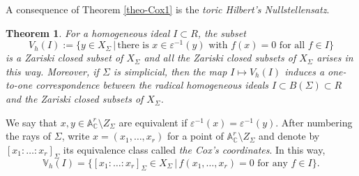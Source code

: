 \documentclass[11pt, reqno]{amsart}
\theoremstyle{plain}
\newtheorem{theorem}{Theorem}[section]
\theoremstyle{definition}
\theoremstyle{remark}
\begin{document}
A consequence of Theorem \ref{theo-Cox1} is the \emph{toric Hilbert's Nullstellensatz}.
\begin{theorem}\cite[Propositions 5.2.4, 5.2.6]{CLS11}
For a homogeneous ideal $I\subset R$, the subset
$$V_{h}(I):= \{y\in X_{\Sigma}\, |\, \text{there is }x\in\varepsilon^{-1}(y)\text{ with } f(x) = 0\text{ for all }f\in I\}$$
is a Zariski closed subset of $X_{\Sigma}$ and all the Zariski closed subsets of $X_{\Sigma}$ arises in this way. Moreover, if $\Sigma$ is simplicial, then
the map $I\mapsto V_{h}(I)$ induces a one-to-one correspondence between the radical homogeneous ideals $I\subset  B(\Sigma)\subset R$ and the Zariski closed subsets of $X_{\Sigma}$. 
\end{theorem}
We say that $x, y\in\mathbb{A}^{r}_{\mathbb{C}}\setminus Z_{\Sigma}$ are equivalent if 
$\varepsilon^{-1}(x) =  \varepsilon^{-1}(y)$. After numbering the rays of $\Sigma$, write $x =  (x_{1}, \ldots, x_{r})$ for a point of $\mathbb{A}^{r}_{\mathbb{C}}\setminus Z_{\Sigma}$ and denote by $[x_{1}:\ldots: x_{r}]_{\Sigma}$ its equivalence class called \emph{the Cox's coordinates}. In this way,  $$\mathbb{V}_{h}(I)=\{ [x_{1}:\ldots: x_{r}]_{\Sigma}\in X_{\Sigma}\,|\, f(x_{1}, \ldots, x_{r}) =  0\text{ for any } f\in I\}.$$
\end{document}
